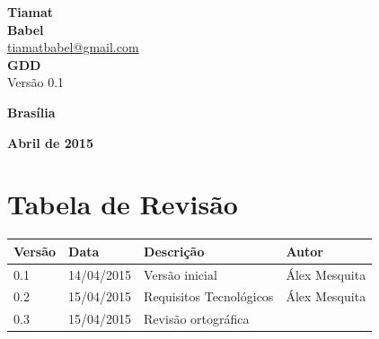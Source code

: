 \documentclass[11pt]{article} %
\begin{document}
\begin{titlepage}
 \vfill
  \begin{center}
   {\large \textbf{Tiamat}} \\
   {\large \textbf{Babel}}\\
   {\large \href{mailto:tiamatbabel@gmail.com}{tiamatbabel@gmail.com}}\\[6cm]


   {\Large \textbf{GDD}}\\
   {\Large Versão 0.1}\\[6cm]

   \hspace{.45\textwidth} %
  \vfill

\vspace{2cm}

\large \textbf{Brasília}

\large \textbf{Abril de 2015}
\end{center}
\end{titlepage}
\newpage

\tableofcontents

\newpage


\section{Tabela de Revisão}


\begin{table}[h]
\begin{tabular}{|l|l|p{60mm}|l|}

\hline
\textbf{Versão}     & \textbf{Data}     & \textbf{Descrição}                                & \textbf{Autor}    \\ \hline
0.1                 & 14/04/2015        & Versão inicial                                    & Álex Mesquita     \\ \hline
0.2                 & 15/04/2015        & Requisitos Tecnológicos                           & Álex Mesquita     \\ \hline
0.3                 & 15/04/2015        & Revisão ortográfica                                                   &                   \\ \hline
\end{tabular}
\end{table}
\end{document}
